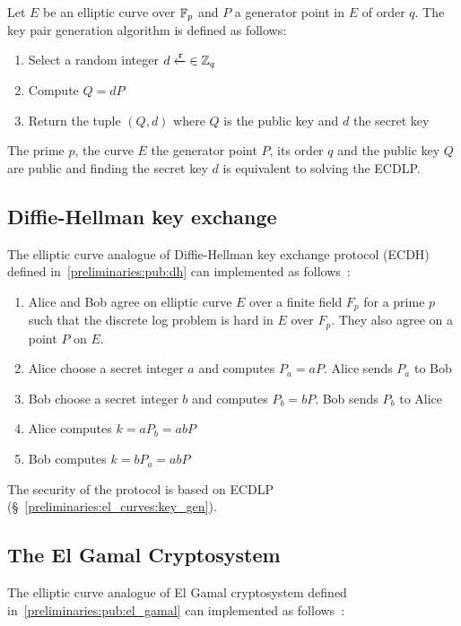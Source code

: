 Let $E$ be an elliptic curve over $\mathbb{F}_p$ and $P$ a generator point in $E$ of order $q$. The key pair generation algorithm is defined as follows:

\begin{enumerate}
  \item Select a random integer $d \xleftarrow{\mathtt{r}}{\in \mathbb{Z}_q}$
  \item Compute $Q = dP$
  \item Return the tuple $(Q, d)$ where $Q$ is the public key and $d$ the secret key
\end{enumerate}

The prime $p$, the curve $E$ the generator point $P$, its order $q$ and the public key $Q$ are public and finding the secret key $d$ is equivalent to solving the ECDLP.

\subsection{Diffie-Hellman key exchange}
\label{preliminaries:el_curves:dh}

The elliptic curve analogue of Diffie-Hellman key exchange protocol (ECDH) defined in~\ref{preliminaries:pub:dh} can implemented as follows~\cite{elliptic_curves}:

\begin{enumerate}
  \item Alice and Bob agree on elliptic curve $E$ over a finite field $F_p$ for a prime $p$ such that the discrete log problem is hard in $E$ over $F_p$. They also agree on a point $P$ on $E$.
  \item Alice choose a secret integer $a$ and computes $P_a = aP$. Alice sends $P_a$ to Bob
  \item Bob choose a secret integer $b$ and computes $P_b = bP$. Bob sends $P_b$ to Alice
  \item Alice computes $k = aP_b = abP$
  \item Bob computes $k = bP_a = abP$
\end{enumerate}

The security of the protocol is based on ECDLP (§~\ref{preliminaries:el_curves:key_gen}).

\subsection{The El Gamal Cryptosystem}
\label{preliminaries:el_curves:el_gamal}

The elliptic curve analogue of El Gamal cryptosystem defined in~\ref{preliminaries:pub:el_gamal} can implemented as follows~\cite{elliptic_curves_2}:

